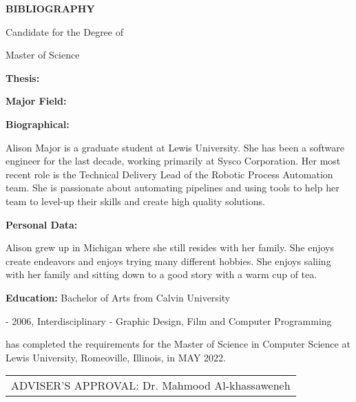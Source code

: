 \begin{singlespace}
  \begin{center}
    \large
    \textbf{BIBLIOGRAPHY}  %
    
    \vspace{0.5cm}
    \textbf{\paperAuthor}
  
    \vspace{0.5cm}
    Candidate for the Degree of
  
    \vspace{0.5cm}
    Master of Science
  \end{center}
  
  \vspace{1cm}
  \noindent
  \textbf{Thesis:} \MakeUppercase{\paperTitle}
  
  \vspace{0.5cm}
  \noindent
  \textbf{Major Field:} \authorConcentration
  
  \vspace{0.5cm}
  \noindent
  \textbf{Biographical:}
  
  \begin{footnotesize}
    \noindent
    Alison Major is a graduate student at Lewis University. She has been a software engineer for the last decade, working primarily at Sysco Corporation. Her most recent role is the Technical Delivery Lead of the Robotic Process Automation team. She is passionate about automating pipelines and using tools to help her team to level-up their skills and create high quality solutions.
  \end{footnotesize}

  \vspace{0.5cm}
  \noindent
  \textbf{Personal Data:}

  \begin{footnotesize}
    \noindent
    Alison grew up in Michigan where she still resides with her family. She enjoys create endeavors and enjoys trying many different hobbies. She enjoys saliing with her family and sitting down to a good story with a warm cup of tea.
  \end{footnotesize}
  
  \vspace{0.5cm}
  \noindent
  \textbf{Education:} Bachelor of Arts from Calvin University
  
  \begin{footnotesize}
     - 2006, Interdisciplinary - Graphic Design, Film and Computer Programming
  \end{footnotesize}
  
  \vspace{1.5cm}
  \noindent
  \paperAuthor \space has completed the requirements for the Master of Science in Computer Science at Lewis University, Romeoville, Illinois, in MAY 2022.
  
  \vspace{1.5cm}
  \noindent
  \begin{tabular}{ p{} } 
    \hline
    ADVISER'S APPROVAL: Dr. Mahmood Al-khassaweneh \\ 
  \end{tabular}  
\end{singlespace}

